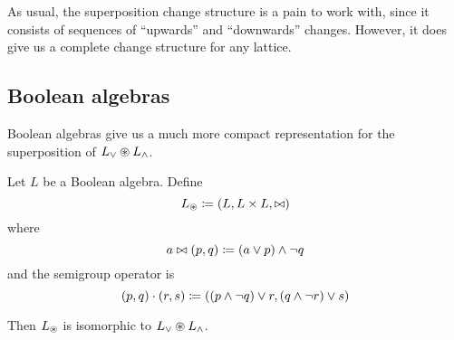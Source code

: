 As usual, the superposition change structure is a pain to work with, since it
consists of sequences of ``upwards'' and ``downwards'' changes. However, it does
give us a complete change structure for any lattice.

\subsection{Boolean algebras}

Boolean algebras give us a much more compact representation for the
superposition of $L_\vee \circledast L_\wedge$.

\begin{prop}
  Let $L$ be a Boolean algebra. Define
  $$L_\circledast \coloneqq (L,L \times L,\bowtie)$$
  where
  $$a \bowtie (p, q) \coloneqq (a \vee p) \wedge \neg q$$
  and the semigroup operator is
  $$(p, q) \cdot (r, s) \coloneqq ((p \wedge \neg q) \vee r, (q \wedge \neg r) \vee s)$$

  Then $L_\circledast$ is isomorphic to $L_\vee \circledast L_\wedge$.
\end{prop}
